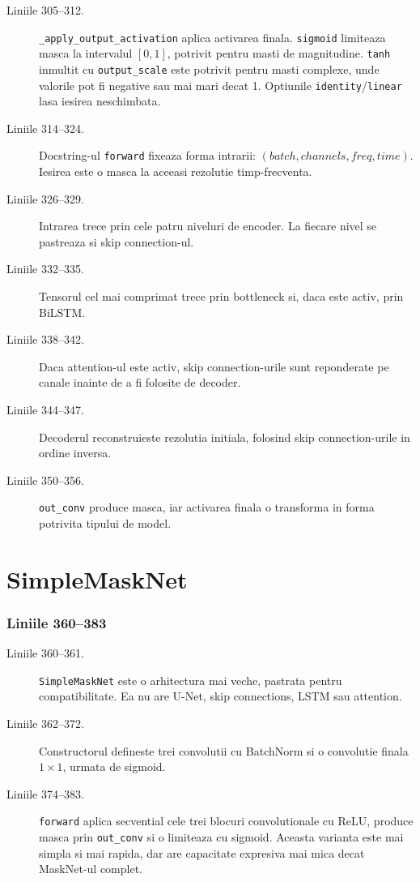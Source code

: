 \documentclass[12pt,a4paper]{report}
\newcommand{\codechunk}[2]{%
\subsection*{Liniile #1--#2}

}
\begin{document}
\begin{description}
    \item[Liniile 305--312.] \texttt{\_apply\_output\_activation} aplica activarea
    finala. \texttt{sigmoid} limiteaza masca la intervalul \([0,1]\), potrivit
    pentru masti de magnitudine. \texttt{tanh} inmultit cu \texttt{output\_scale}
    este potrivit pentru masti complexe, unde valorile pot fi negative sau mai
    mari decat 1. Optiunile \texttt{identity}/\texttt{linear} lasa iesirea neschimbata.

    \item[Liniile 314--324.] Docstring-ul \texttt{forward} fixeaza forma intrarii:
    \((batch, channels, freq, time)\). Iesirea este o masca la aceeasi rezolutie
    timp-frecventa.

    \item[Liniile 326--329.] Intrarea trece prin cele patru niveluri de encoder.
    La fiecare nivel se pastreaza si skip connection-ul.

    \item[Liniile 332--335.] Tensorul cel mai comprimat trece prin bottleneck si,
    daca este activ, prin BiLSTM.

    \item[Liniile 338--342.] Daca attention-ul este activ, skip connection-urile
    sunt reponderate pe canale inainte de a fi folosite de decoder.

    \item[Liniile 344--347.] Decoderul reconstruieste rezolutia initiala, folosind
    skip connection-urile in ordine inversa.

    \item[Liniile 350--356.] \texttt{out\_conv} produce masca, iar activarea finala
    o transforma in forma potrivita tipului de model.
\end{description}

\chapter{SimpleMaskNet}

\codechunk{360}{383}

\begin{description}
    \item[Liniile 360--361.] \texttt{SimpleMaskNet} este o arhitectura mai veche,
    pastrata pentru compatibilitate. Ea nu are U-Net, skip connections, LSTM sau
    attention.

    \item[Liniile 362--372.] Constructorul defineste trei convolutii cu BatchNorm
    si o convolutie finala \(1 \times 1\), urmata de sigmoid.

    \item[Liniile 374--383.] \texttt{forward} aplica secvential cele trei blocuri
    convolutionale cu ReLU, produce masca prin \texttt{out\_conv} si o limiteaza
    cu sigmoid. Aceasta varianta este mai simpla si mai rapida, dar are capacitate
    expresiva mai mica decat MaskNet-ul complet.
\end{description}
\end{document}
